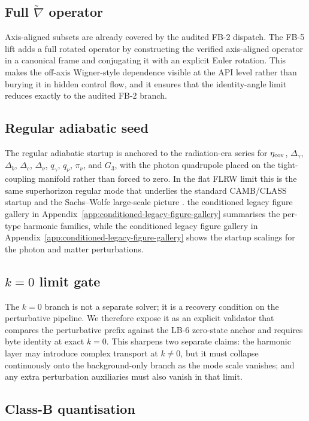 \subsection{Full $\tilde{\nabla}$ operator}

Axis-aligned subsets are already covered by the audited
FB-2 dispatch.  The FB-5 lift adds a full rotated operator by
constructing the verified axis-aligned operator in a canonical
frame and conjugating it with an explicit Euler rotation.  This
makes the off-axis Wigner-style dependence visible at the API
level rather than burying it in hidden control flow, and it
ensures that the identity-angle limit reduces exactly to the
audited FB-2 branch.

\subsection{Regular adiabatic seed}

The regular adiabatic startup is anchored to the radiation-era
series for $\eta_{\rm cov}$, $\Delta_\gamma$, $\Delta_b$,
$\Delta_c$, $\Delta_\nu$, $q_\gamma$, $q_\nu$, $\pi_\nu$, and
$G_3$, with the photon quadrupole placed on the tight-coupling
manifold rather than forced to zero.  In the flat FLRW limit this
is the same superhorizon regular mode that underlies the standard
CAMB/CLASS startup and the Sachs--Wolfe large-scale picture
\cite{SachsWolfe1967}.  the conditioned legacy figure gallery in Appendix~\ref{app:conditioned-legacy-figure-gallery}
summarises the per-type harmonic families, while
the conditioned legacy figure gallery in Appendix~\ref{app:conditioned-legacy-figure-gallery} shows the startup
scalings for the photon and matter perturbations.

\subsection{$k = 0$ limit gate}

The $k = 0$ branch is not a separate solver; it is a recovery
condition on the perturbative pipeline.  We therefore expose it as
an explicit validator that compares the perturbative prefix
against the LB-6 zero-state anchor and requires byte identity at
exact $k = 0$.  This sharpens two separate claims: the harmonic
layer may introduce complex transport at $k \neq 0$, but it must
collapse continuously onto the background-only branch as the mode
scale vanishes; and any extra perturbation auxiliaries must also
vanish in that limit.

\subsection{Class-B quantisation}

